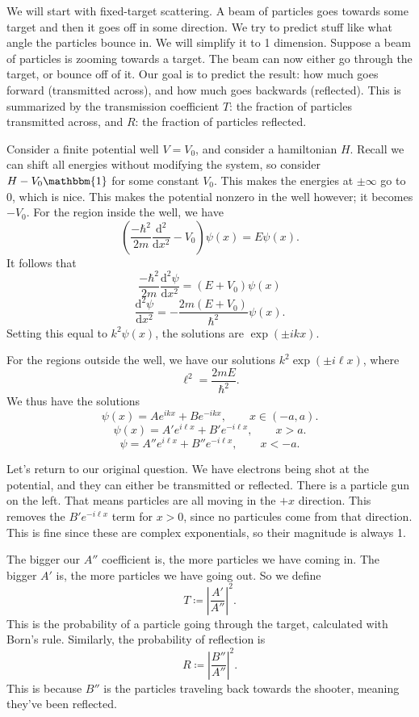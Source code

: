 We will start with fixed-target scattering. A beam of particles goes towards some target and then it goes off in some direction. %
We try to predict stuff like what angle the particles bounce in. We will simplify it to 1 dimension. Suppose a beam of particles is zooming towards a target. The beam can now either go through the target, or bounce off of it. Our goal is to predict the result: how much goes forward (transmitted across), and how much goes backwards (reflected). This is summarized by the transmission coefficient $T$: the fraction of particles transmitted across, and $R$: the fraction of particles reflected.

Consider a finite potential well $V=V_0$, and consider a hamiltonian $H$. Recall we can shift all energies without modifying the system, so consider $H-V_0\mathbbm{1}$ for some constant $V_0$. This makes the energies at $\pm \infty $ go to 0, which is nice. This makes the potential nonzero in the well however; it becomes $-V_0$. For the region inside the well, we have
\[
	\left( \frac{-\hbar ^2}{2m} \frac{\mathrm{d}^2}{\mathrm{d}x^2} -V_0 \right) \psi (x)=E\psi(x)
.\]
It follows that
\[
	\frac{-\hbar ^2}{2m} \frac{\mathrm{d}^2\psi }{\mathrm{d}x^2} =(E+V_0)\psi (x)
\]
\[
	\frac{\mathrm{d}^2\psi }{\mathrm{d}x^2} =-\frac{2m(E+V_0)}{\hbar ^2} \psi (x)
.\]
Setting this equal to $k^2\psi (x)$, the solutions are $\exp (\pm ikx)$.

For the regions outside the well, we have our solutions $k^2 \exp (\pm i\ell x)$, where
\[
	\ell^2 =\frac{2mE}{\hbar^2} 
.\]
We thus have the solutions
\[
	\psi (x)=Ae^{ikx} +Be^{-ikx} ,\qquad x\in(-a,a)
.\]
\[
	\psi (x)=A'e^{i\ell x}+B'e^{-i\ell x}  ,\qquad x>a
.\]
\[
	\psi =A''e^{i\ell x}+B''e^{-i\ell x} ,\qquad x<-a
.\]

Let's return to our original question. We have electrons being shot at the potential, and they can either be transmitted or reflected. There is a particle gun on the left. %
That means particles are all moving in the $+x$ direction. This removes the $B'e^{-i\ell x} $ term for $x>0$, since no particules come from that direction. This is fine since these are complex exponentials, so their magnitude is always 1.

The bigger our $A''$ coefficient is, the more particles we have coming in. The bigger $A'$ is, the more particles we have going out. So we define
\[
	T\coloneqq \left| \frac{A'}{A''}  \right| ^2
.\]
This is the probability of a particle going through the target, calculated with Born's rule. Similarly, the probability of reflection is
\[
	R\coloneqq \left| \frac{B''}{A''}  \right| ^2
.\]
This is because $B''$ is the particles traveling back towards the shooter, meaning they've been reflected.

